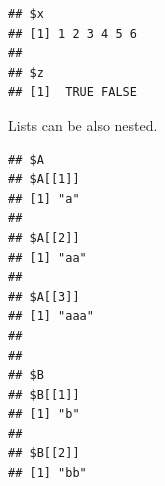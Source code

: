 \documentclass[krantz2]{krantz}\usepackage{knitr}%
\begin{document}
\begin{knitrout}\footnotesize
{}\color{fgcolor}\begin{kframe}
\begin{alltt}
\hlopt{$} \hlkwb{<-} 
\end{alltt}
\begin{verbatim}
## $x
## [1] 1 2 3 4 5 6
## 
## $z
## [1]  TRUE FALSE
\end{verbatim}
\end{kframe}
\end{knitrout}

Lists can be also nested.

\begin{knitrout}\footnotesize
{}\color{fgcolor}\begin{kframe}
\begin{alltt}
 \hlkwb{<-} \hlstd{(}\hlstd{,} \hlstd{,} \hlstd{)}
 \hlkwb{<-} \hlstd{(}\hlstd{,} \hlstd{)}
 \hlkwb{<-} \hlstd{(}   
\end{alltt}
\begin{verbatim}
## $A
## $A[[1]]
## [1] "a"
## 
## $A[[2]]
## [1] "aa"
## 
## $A[[3]]
## [1] "aaa"
## 
## 
## $B
## $B[[1]]
## [1] "b"
## 
## $B[[2]]
## [1] "bb"
\end{verbatim}
\end{kframe}
\end{knitrout}
\end{document}
